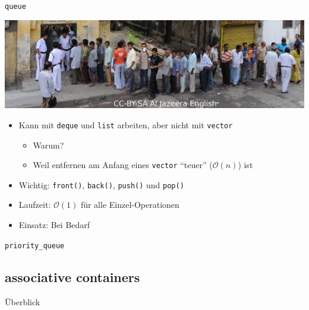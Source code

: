 \begin{frame}{\texttt{queue}}
	\begin{center}
		\includegraphics[width=0.7\linewidth]{images/queue.jpg}
	\end{center}
	
	\begin{itemize}
		\item Kann mit \texttt{deque} und \texttt{list} arbeiten, aber nicht mit \texttt{vector}
		\begin{itemize}
			\item \alert{Warum?}
			\pause
			\item Weil entfernen am Anfang eines \texttt{vector} \enquote{teuer} ($\mathcal{O}(n)$) ist
		\end{itemize}
		\item Wichtig: \texttt{front()}, \texttt{back()}, \texttt{push()} und \texttt{pop()}
		\item Laufzeit: $\mathcal{O}(1)$ für alle Einzel-Operationen
	\end{itemize}
	
	\begin{itemize}
		\item Einsatz: Bei Bedarf
	\end{itemize}
\end{frame}

\begin{frame}{\texttt{priority\_queue}}

\end{frame}

\subsection{associative containers}

\begin{frame}{Überblick}

\end{frame}


